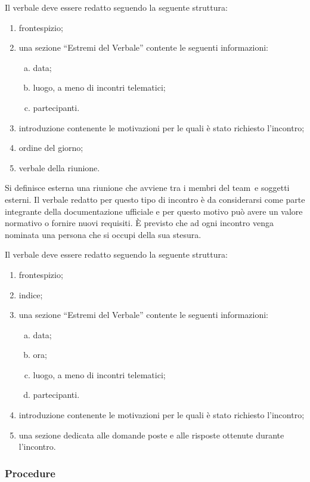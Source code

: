 \documentclass[../NormeProgetto.tex]{subfiles}
\begin{document}
			Il verbale deve essere redatto seguendo la seguente struttura:
			\begin{enumerate}
				\item frontespizio;
				\item una sezione ``Estremi del Verbale'' contente le seguenti informazioni:
				\begin{enumerate}[a.]
					\item data;
					\item luogo, a meno di incontri telematici;
					\item partecipanti.
				\end{enumerate}
				\item introduzione contenente le motivazioni per le quali è stato richiesto l'incontro;
				\item ordine del giorno;
				\item verbale della riunione.
			\end{enumerate}

			Si definisce esterna una riunione che avviene tra i membri del team\g\ e soggetti esterni. Il verbale redatto per questo tipo di incontro è da considerarsi come parte integrante della documentazione ufficiale e per questo motivo può avere un valore normativo o fornire nuovi requisiti. È previsto che ad ogni incontro venga nominata una persona che si occupi della sua stesura.
			
			Il verbale deve essere redatto seguendo la seguente struttura:
			\begin{enumerate}
				\item frontespizio;
				\item indice;
				\item una sezione ``Estremi del Verbale'' contente le seguenti informazioni:
				\begin{enumerate}[a.]
					\item data;
					\item ora;
					\item luogo, a meno di incontri telematici;
					\item partecipanti.
				\end{enumerate}
				\item introduzione contenente le motivazioni per le quali è stato richiesto l'incontro;
				\item una sezione dedicata alle domande poste e alle risposte ottenute durante l'incontro.
			\end{enumerate}
	\subsubsection{Procedure}		
\end{document}
